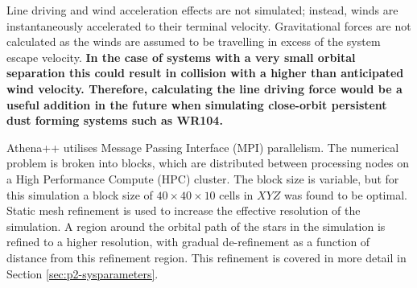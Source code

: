 \documentclass[fleqn,usenatbib]{mnras}
\begin{document}
Line driving and wind acceleration effects are not simulated;
instead, winds are instantaneously accelerated to their terminal velocity.
Gravitational forces are not calculated as the winds are assumed to be travelling in excess of the system escape velocity.
\textbf{In the case of systems with a very small orbital separation this could result in collision with a higher than anticipated wind velocity.
Therefore, calculating the line driving force would be a useful addition in the future when simulating close-orbit persistent dust forming systems such as WR104.}

Athena++ utilises Message Passing Interface (MPI) parallelism.
The numerical problem is broken into blocks, which are distributed between processing nodes on a High Performance Compute (HPC) cluster.
The block size is variable, but for this simulation a block size of $40\times 40 \times 10$ cells in $XYZ$ was found to be optimal.
Static mesh refinement is used to increase the effective resolution of the simulation.
A region around the orbital path of the stars in the simulation is refined to a higher resolution, with gradual de-refinement as a function of distance from this refinement region.
This refinement is covered in more detail in Section \ref{sec:p2-sysparameters}.
\end{document}
